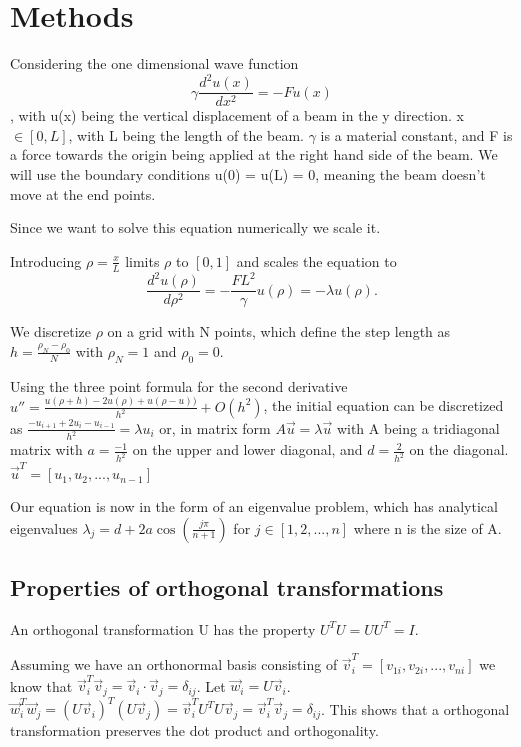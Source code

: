 \section{Methods}


Considering the one dimensional wave function
\begin{equation}
\gamma \frac{d^2 u(x)}{dx^2} = -F u(x)
\end{equation}
, with u(x) being the vertical displacement of a beam in the y direction.
x $\in [0, L]$, with L being the length of the beam. $\gamma$ is a material constant,
and F is a force towards the origin being applied at the right hand side of the beam.
We will use the boundary conditions u(0) = u(L) = 0, meaning the beam doesn't move
at the end points.


Since we want to solve this equation numerically we scale it.

Introducing $ \rho = \frac{x}{L} $ limits $\rho$ to $[0, 1]$ and scales the
equation to
$$\frac{d^2 u(\rho)}{d\rho^2} = - \frac{FL^2}{\gamma} u(\rho) = -\lambda u(\rho).$$

We discretize $\rho$ on a grid with N points, which
define the step length as $h = \frac{\rho_N - \rho_0}{N}$ with $\rho_N = 1$ and
$\rho_0 = 0$.

Using the three point formula for the second derivative $ u'' = \frac{u(\rho + h) - 2u(\rho) +
u(\rho -u))}{h^2} + O(h^2)$, the initial equation can be discretized as
$\frac{-u_{i+1} + 2u_i - u_{i-1}}{h^2} = \lambda u_i$
or, in matrix form
$ A \vec{u} = \lambda \vec{u}$
with A being a tridiagonal matrix with $a = \frac{-1}{h^2}$ on the upper and lower
diagonal, and $d = \frac{2}{h^2}$ on the diagonal. $\vec{u}^T = [u_1, u_2, ..., u_{n-1}]$

Our equation is now in the form of an eigenvalue problem, which has analytical
eigenvalues $\lambda_j = d + 2a\cos{(\frac{j\pi}{n+1})}$ for $j \in [1,2,...,n]$
where n is the size of A.

\subsection{Properties of orthogonal transformations}

An orthogonal transformation U has the property $U^T U = U U^T = I$.

Assuming we have an orthonormal basis consisting of $\vec{v}_i^T = [v_{1i},
v_{2i}, ... , v_{ni}]$ we know that $\vec{v}_i^T \vec{v}_j = \vec{v}_i \cdot
\vec{v}_j = \delta_{ij}$. Let $\vec{w}_i = U\vec{v}_i$. $\vec{w}_i^T \vec{w}_j =
(U\vec{v}_i)^T(U\vec{v}_j) = \vec{v}_i^T U^T U \vec{v}_j = \vec{v}_i^T \vec{v}_j
= \delta_{ij}$. This shows that a orthogonal transformation preserves the dot
product and orthogonality.

